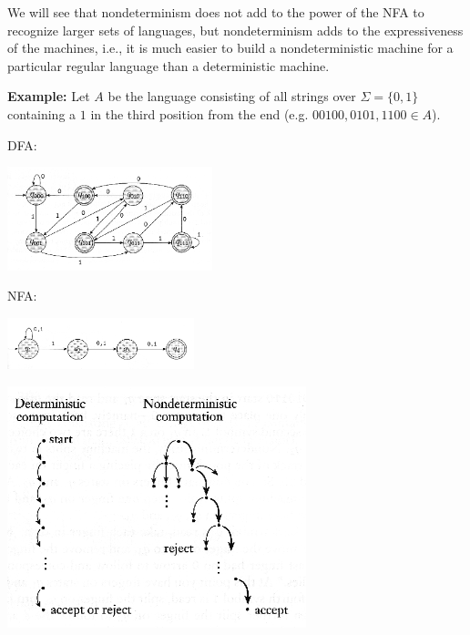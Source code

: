 \documentclass[a4paper,blends,pdf,colorBG,slideColor]{prosper}
\begin{document}
We will see that nondeterminism does not add to the power of the NFA to recognize larger sets of languages, but nondeterminism adds to the expressiveness of the machines, i.e., it is much easier to build a nondeterministic machine for a particular
regular language than a deterministic machine.

\es


{\bf Example:} Let $A$ be the language consisting of all strings over $\Sigma = \{0,1\}$
containing a $1$ in the third position from the end (e.g. $00100,0101,1100\in A$).

DFA:
\begin{center}
\includegraphics[height=30mm]{images/dfa.eps}
\end{center}

NFA:
\begin{center}
\includegraphics[height=15mm]{images/nfa.eps}
\end{center}

\es

\begin{center}
\includegraphics[height=70mm]{images/nfa-comp.eps}
\end{center}
\es
\end{document}
